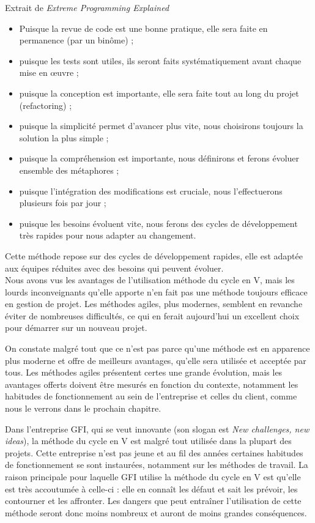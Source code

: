 Extrait de \textit{Extreme Programming Explained}
\begin{Quote}
\begin{itemize}
\item Puisque la revue de code est une bonne pratique, elle sera faite en permanence (par un binôme) ;
\item puisque les tests sont utiles, ils seront faits systématiquement avant chaque mise en œuvre ;
\item puisque la conception est importante, elle sera faite tout au long du projet (refactoring) ;
\item puisque la simplicité permet d'avancer plus vite, nous choisirons toujours la solution la plus simple ;
\item puisque la compréhension est importante, nous définirons et ferons évoluer ensemble des métaphores ;
\item puisque l'intégration des modifications est cruciale, nous l'effectuerons plusieurs fois par jour ;
\item puisque les besoins évoluent vite, nous ferons des cycles de développement très rapides pour nous adapter au changement.
\end{itemize}
\end{Quote}

Cette méthode repose sur des cycles de développement rapides, elle est adaptée aux équipes réduites avec des besoins qui peuvent évoluer.
\\
Nous avons vus les avantages de l'utilisation méthode du cycle en V, mais les lourds inconveignants qu'elle apporte n'en fait pas une méthode toujours efficace en gestion de projet. Les méthodes agiles, plus modernes, semblent en revanche éviter de nombreuses difficultés, ce qui en ferait aujourd'hui un excellent choix pour démarrer sur un nouveau projet.

On constate malgré tout que ce n'est pas parce qu'une méthode est en apparence plus moderne et offre de meilleurs avantages, qu'elle sera utilisée et acceptée par tous. Les méthodes agiles présentent certes une grande évolution, mais les avantages offerts doivent être mesurés en fonction du contexte, notamment les habitudes de fonctionnement au sein de l'entreprise et celles du client, comme nous le verrons dans le prochain chapitre.

\begin{app}
Dans l'entreprise GFI, qui se veut innovante (son slogan est \textit{New challenges, new ideas}), la méthode du cycle en V est malgré tout utilisée dans la plupart des projets. Cette entreprise n'est pas jeune et au fil des années certaines habitudes de fonctionnement se sont instaurées, notamment sur les méthodes de travail. La raison principale pour laquelle GFI utilise la méthode du cycle en V est qu'elle est très accoutumée à celle-ci : elle en connaît les défaut et sait les prévoir, les contourner et les affronter. Les dangers que peut entraîner l'utilisation de cette méthode seront donc moins nombreux et auront de moins grandes conséquences.
\end{app}

